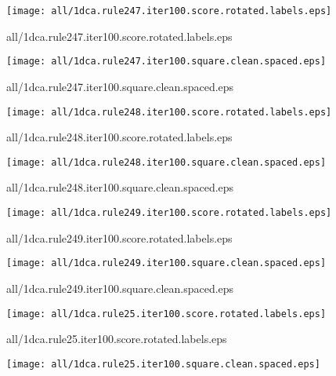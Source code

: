 \documentclass{article}
\begin{document}
\begin{center}
\begin{minipage}{\textwidth}
\texttt{[image: all/1dca.rule247.iter100.score.rotated.labels.eps]}
\end{minipage}
\end{center}
{\footnotesize all/1dca.rule247.iter100.score.rotated.labels.eps}
\begin{center}
\begin{minipage}{\textwidth}
\texttt{[image: all/1dca.rule247.iter100.square.clean.spaced.eps]}
\end{minipage}
\end{center}
{\footnotesize all/1dca.rule247.iter100.square.clean.spaced.eps}
\begin{center}
\begin{minipage}{\textwidth}
\texttt{[image: all/1dca.rule248.iter100.score.rotated.labels.eps]}
\end{minipage}
\end{center}
{\footnotesize all/1dca.rule248.iter100.score.rotated.labels.eps}
\begin{center}
\begin{minipage}{\textwidth}
\texttt{[image: all/1dca.rule248.iter100.square.clean.spaced.eps]}
\end{minipage}
\end{center}
{\footnotesize all/1dca.rule248.iter100.square.clean.spaced.eps}
\begin{center}
\begin{minipage}{\textwidth}
\texttt{[image: all/1dca.rule249.iter100.score.rotated.labels.eps]}
\end{minipage}
\end{center}
{\footnotesize all/1dca.rule249.iter100.score.rotated.labels.eps}
\begin{center}
\begin{minipage}{\textwidth}
\texttt{[image: all/1dca.rule249.iter100.square.clean.spaced.eps]}
\end{minipage}
\end{center}
{\footnotesize all/1dca.rule249.iter100.square.clean.spaced.eps}
\begin{center}
\begin{minipage}{\textwidth}
\texttt{[image: all/1dca.rule25.iter100.score.rotated.labels.eps]}
\end{minipage}
\end{center}
{\footnotesize all/1dca.rule25.iter100.score.rotated.labels.eps}
\begin{center}
\begin{minipage}{\textwidth}
\texttt{[image: all/1dca.rule25.iter100.square.clean.spaced.eps]}
\end{minipage}
\end{center}
\end{document}
